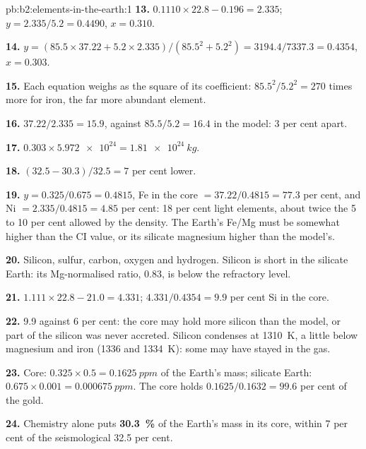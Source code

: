 \begin{solution}{pb:b2:elements-in-the-earth:1}
\textbf{13.} $0.1110\times22.8 - 0.196 = 2.335$; $y = 2.335/5.2 = 0.4490$, $x = 0.310$.

\textbf{14.} $y = (85.5\times37.22 + 5.2\times2.335)/(85.5^2 + 5.2^2) =
3194.4/7337.3 = 0.4354$, $x = 0.303$.

\textbf{15.} Each equation weighs as the square of its coefficient: $85.5^2/5.2^2 = 270$
times more for iron, the far more abundant element.

\textbf{16.} $37.22/2.335 = 15.9$, against $85.5/5.2 = 16.4$ in the model: 3 per cent
apart.

\textbf{17.} $0.303\times\num{5.972e24} = \qty{1.81e24}{kg}$.

\textbf{18.} $(32.5-30.3)/32.5 = 7$ per cent lower.

\textbf{19.} $y = 0.325/0.675 = 0.4815$, Fe in the core $= 37.22/0.4815 = 77.3$ per cent,
and Ni $= 2.335/0.4815 = 4.85$ per cent: 18 per cent light elements, about twice the 5 to
10 per cent allowed by the density. The Earth's Fe/Mg must be somewhat higher than the CI
value, or its silicate magnesium higher than the model's.

\textbf{20.} Silicon, sulfur, carbon, oxygen and hydrogen. Silicon is short in the
silicate Earth: its Mg-normalised ratio, 0.83, is below the refractory level.

\textbf{21.} $1.111\times22.8 - 21.0 = 4.331$; $4.331/0.4354 = 9.9$ per cent Si in the
core.

\textbf{22.} 9.9 against 6 per cent: the core may hold more silicon than the model, or
part of the silicon was never accreted. Silicon condenses at \qty{1310}{K}, a little
below magnesium and iron (1336 and \qty{1334}{K}): some may have stayed in the gas.

\textbf{23.} Core: $0.325\times0.5 = \qty{0.1625}{ppm}$ of the Earth's mass; silicate
Earth: $0.675\times0.001 = \qty{0.000675}{ppm}$. The core holds
$0.1625/0.1632 = 99.6$ per cent of the gold.

\textbf{24.} Chemistry alone puts
\textbf{\qty[text-series-to-math=true]{30.3}{\percent}} of the Earth's mass in its core,
within 7 per cent of the seismological 32.5 per cent.
\end{solution}

